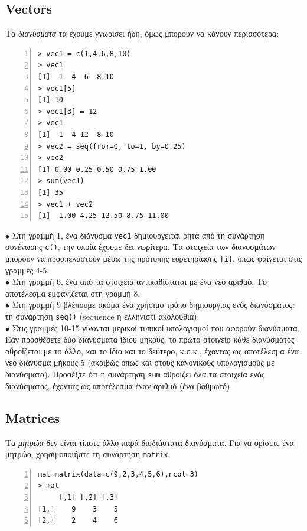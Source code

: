 \documentclass[a4paper,11pt,twocolumn,tablecaptionabove]{scrartcl}
\begin{document}
\subsection{Vectors}

Τα \emph{διανύσματα} τα έχουμε γνωρίσει ήδη, όμως μπορούν να κάνουν περισσότερα:

\begin{Verbatim}[frame=single,numbers=left,gobble=0, xleftmargin=0.35cm, numbersep=0.1cm]
> vec1 = c(1,4,6,8,10)
> vec1
[1]  1  4  6  8 10
> vec1[5]
[1] 10
> vec1[3] = 12
> vec1
[1]  1  4 12  8 10
> vec2 = seq(from=0, to=1, by=0.25)
> vec2
[1] 0.00 0.25 0.50 0.75 1.00
> sum(vec1)
[1] 35
> vec1 + vec2
[1]  1.00 4.25 12.50 8.75 11.00
\end{Verbatim}

\noindent $\bullet$  Στη γραμμή 1, ένα διάνυσμα \texttt{vec1} δημιουργείται ρητά από τη συνάρτηση συνένωσης
\texttt{c()}, την οποία έχουμε δει νωρίτερα. Τα στοιχεία των διανυσμάτων μπορούν να προσπελαστούν μέσω της
πρότυπης ευρετηρίασης \texttt{[i]}, όπως φαίνεται στις γραμμές 4-5. \\
\noindent $\bullet$  Στη γραμμή 6, ένα από τα στοιχεία αντικαθίσταται με ένα νέο αριθμό. Το αποτέλεσμα
εμφανίζεται στη γραμμή 8.\\
\noindent $\bullet$ Στη γραμμή 9 βλέπουμε ακόμα ένα χρήσιμο τρόπο δημιουργίας ενός διανύσματος: τη συνάρτηση
\texttt{seq()} (sequence ή ελληνιστί ακολουθία). \\
\noindent $\bullet$ Στις γραμμές 10-15 γίνονται μερικοί τυπικοί υπολογισμοί που αφορούν διανύσματα. Εάν
προσθέσετε δύο διανύσματα ίδιου μήκους, το πρώτο στοιχείο κάθε διανύσματος αθροίζεται με το άλλο, και το ίδιο
και το δεύτερο, κ.ο.κ., έχοντας ως αποτέλεσμα ένα νέο διάνυσμα μήκους 5 (ακριβώς όπως και στους κανονικούς
υπολογισμούς με διανύσματα). Προσέξτε ότι η συνάρτηση \texttt{sum} αθροίζει όλα τα στοιχεία ενός διανύσματος,
έχοντας ως αποτέλεσμα έναν αριθμό (ένα βαθμωτό).

\subsection{Matrices}

Τα \emph{μητρώα} δεν είναι τίποτε άλλο παρά δισδιάστατα διανύσματα. Για να ορίσετε ένα μητρώο, χρησιμοποιήστε
τη συνάρτηση \texttt{matrix}:
\begin{Verbatim}[frame=single,numbers=left,gobble=0, xleftmargin=0.35cm, numbersep=0.1cm]
mat=matrix(data=c(9,2,3,4,5,6),ncol=3)
> mat
     [,1] [,2] [,3]
[1,]    9    3    5
[2,]    2    4    6
\end{Verbatim}
\end{document}
